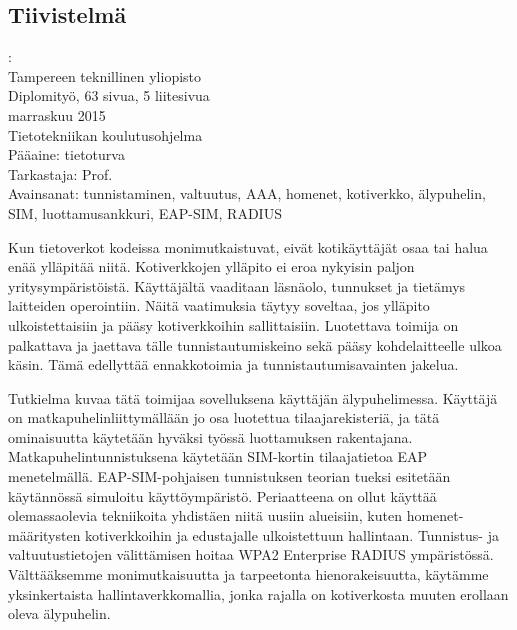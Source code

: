 \documentclass[12pt,a4paper,english]{tutthesis}
\begin{document}
\begin{otherlanguage}{finnish} %
\chapter*{Tiivistelmä}         %

\begin{spacing}{1.0}
         {\bf \textsf{\MakeUppercase{\@author}}}: \@titleB\\  %
         \textsf{Tampereen teknillinen yliopisto}\\
         \textsf{Diplomityö, 63 sivua, 5 liitesivua}\\ %
         \textsf{marraskuu 2015}\\
         \textsf{Tietotekniikan koulutusohjelma}\\
         \textsf{Pääaine: tietoturva}\\
         \textsf{Tarkastaja:  Prof. \@examiner}\\ %
         \textsf{Avainsanat: tunnistaminen, valtuutus, AAA, homenet, kotiverkko, älypuhelin, SIM, luottamusankkuri, EAP-SIM, RADIUS}\\
\end{spacing}
Kun tietoverkot kodeissa monimutkaistuvat, eivät kotikäyttäjät
osaa tai halua enää ylläpitää niitä. Kotiverkkojen ylläpito ei
eroa nykyisin paljon yritysympäristöistä. Käyttäjältä vaaditaan
läsnäolo, tunnukset ja tietämys laitteiden operointiin. Näitä
vaatimuksia
täytyy soveltaa, jos ylläpito ulkoistettaisiin ja pääsy 
kotiverkkoihin sallittaisiin. Luotettava toimija on palkattava
ja jaettava tälle tunnistautumiskeino sekä pääsy kohdelaitteelle
ulkoa käsin. Tämä edellyttää ennakkotoimia ja tunnistautumisavainten jakelua.

Tutkielma kuvaa tätä toimijaa sovelluksena käyttäjän älypuhelimessa.
Käyttäjä on matkapuhelinliittymällään jo osa luotettua
tilaajarekisteriä, ja tätä ominaisuutta käytetään hyväksi työssä 
luottamuksen rakentajana. Matkapuhelintunnistuksena käytetään
SIM-kortin tilaajatietoa EAP menetelmällä. 
EAP-SIM-pohjaisen tunnistuksen teorian tueksi esitetään käytännössä
simuloitu käyttöympäristö. Periaatteena on ollut käyttää
olemassaolevia tekniikoita yhdistäen niitä uusiin alueisiin,
kuten homenet-määritysten kotiverkkoihin ja edustajalle ulkoistettuun
hallintaan. Tunnistus- ja valtuutustietojen välittämisen hoitaa
WPA2 Enterprise RADIUS ympäristössä. Välttääksemme 
monimutkaisuutta ja tarpeetonta hienorakeisuutta, käytämme yksinkertaista 
hallintaverkkomallia, jonka rajalla on kotiverkosta muuten
erollaan oleva älypuhelin.


\end{otherlanguage}
\end{document}
